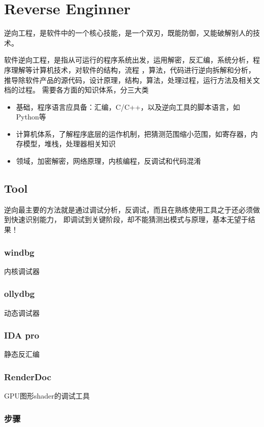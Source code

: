 \clearpage
\part{Reverse Enginner}
逆向工程，是软件中的一个核心技能，是一个双刃，既能防御，又能破解别人的技术。

软件逆向工程，是指从可运行的程序系统出发，运用解密，反汇编，系统分析，程序理解等计算机技术，对软件的结构，流程
，算法，代码进行逆向拆解和分析，推导除软件产品的源代码，设计原理，结构，算法，处理过程，运行方法及相关文档的过程。
需要各方面的知识体系，分三大类
\begin{itemize}
    \item {基础，程序语言应具备：汇编，C/C++，以及逆向工具的脚本语言，如Python等}
    \item {计算机体系，了解程序底层的运作机制，把猜测范围缩小范围，如寄存器，内存模型，堆栈，处理器相关知识}
    \item {领域，加密解密，网络原理，内核编程，反调试和代码混淆}
\end{itemize}

\chapter{Tool}

逆向最主要的方法就是通过调试分析，反调试，而且在熟练使用工具之于还必须做到快速识别能力，
即调试到关键阶段，却不能猜测出模式与原理，基本无望于结果！

\section{windbg}
内核调试器

\section{ollydbg}
动态调试器

\section{IDA pro}
静态反汇编

\section{RenderDoc}
GPU图形shader的调试工具


\section{步骤}

